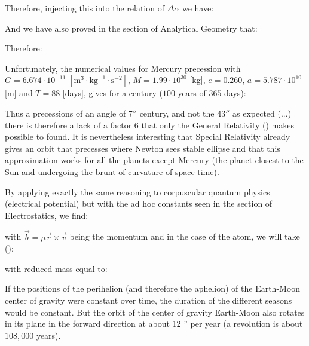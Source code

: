 	Therefore, injecting this into the relation of $\Delta \alpha$	we have:
	
	And we have also proved in the section of Analytical Geometry that:
	
	Therefore:
	
	Unfortunately, the numerical values for Mercury precession with $G=6.674\cdot 10^{-11}\;[\text{m}^3\cdot\text{kg}^{-1}\cdot \text{s}^{-2} ]$, $M=1.99\cdot 10^{30}$ [kg], $e=0.260$, $a=5.787\cdot 10^{10}$ [m] and $T=88$ [days], gives for a century ($100$ years of $365$ days):
	
	Thus a precessions of an angle of $7''$ century, and not the $43''$ as expected (...) there is therefore a lack of a factor $6$ that only the General Relativity () makes possible to found. It is nevertheless interesting that Special Relativity already gives an orbit that precesses where Newton sees stable ellipse and that this approximation works for all the planets except Mercury (the planet closest to the Sun and undergoing the brunt of curvature of space-time).
	\begin{tcolorbox}[title=Remark,colframe=black,arc=10pt]
	By applying exactly the same reasoning to corpuscular quantum physics (electrical potential) but with the ad hoc constants seen in the section of Electrostatics, we find:
	
	with $\vec{b}=\mu\vec{r}\times\vec{v}$ being the momentum and in the case of the atom, we will take ():
	
	with reduced mass equal to:
	
	\end{tcolorbox}
	If the positions of the perihelion (and therefore the aphelion) of the Earth-Moon center of gravity  were constant over time, the duration of the different seasons would be constant. But the orbit of the center of gravity Earth-Moon also rotates in its plane in the forward direction at about 12 '' per year (a revolution is about $108,000$ years).

